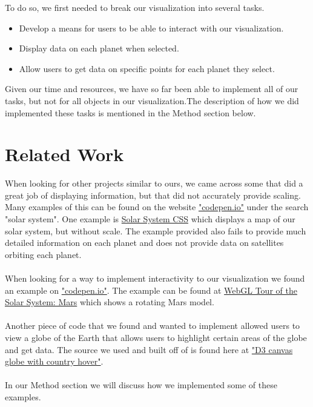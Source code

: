 \documentclass[journal]{vgtc}                %
\begin{document}
To do so, we first needed to break our visualization into several tasks. 
\begin{itemize}
\item Develop a means for users to be able to interact with our visualization.
\item Display data on each planet when selected.
\item Allow users to get data on specific points for each planet they select.
\end{itemize}
Given our time and resources, we have so far been able to implement all of our tasks, but not for all objects in our visualization.The description of how we did implemented these tasks is mentioned in the Method section below.

\section{Related Work}

When looking for other projects similar to ours, we came across some that did a great job of displaying information, but that did not accurately provide scaling. Many examples of this can be found on the website \href{https://codepen.io/}{"codepen.io"} under the search "solar system". One example is \href{https://codepen.io/simoberny/pen/EZgVRo}{Solar System CSS} which displays a map of our solar system, but without scale. The example provided also fails to provide much detailed information on each planet and does not provide data on satellites orbiting each planet. 
\\\\
When looking for a way to implement interactivity to our visualization we found an example on \href{https://codepen.io/}{"codepen.io"}. The example can be found at \href{https://codepen.io/dudleystorey/pen/VmJKXe}{WebGL Tour of the Solar System: Mars} which shows a rotating Mars model.
\\\\
Another piece of code that we found and wanted to implement allowed users to view a globe of the Earth that allows users to highlight certain areas of the globe and get data. The source we used and built off of is found here at \href{https://codepen.io/anon/pen/dexxLY?editors=1111}{"D3 canvas globe with country hover"}.
\\\\
In our Method section we will discuss how we implemented some of these examples.
\end{document}
